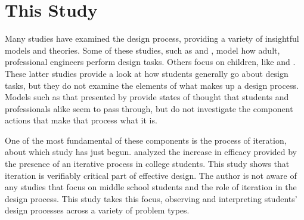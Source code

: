 \section{This Study}
Many studies have examined the design process, providing a variety of insightful models and theories. Some of these studies, such as \citet{schon83} and \citet{eckert09}, model how adult, professional engineers perform design tasks. Others focus on children, like \citet{welch} and \citet{lesh03}. These latter studies provide a look at how students generally go about design tasks, but they do not examine the elements of what makes up a design process. Models such as that presented by \citet{mos-design} provide states of thought that students and professionals alike seem to pass through, but do not investigate the component actions that make that process what it is. 

One of the most fundamental of these components is the process of iteration, about which study has just begun. \citet{dow09} analyzed the increase in efficacy provided by the presence of an iterative process in college students. This study shows that iteration is verifiably critical part of effective design.  %
The author is not aware of any studies that focus on middle school students and the role of iteration in the design process. This study takes this focus, observing and interpreting students' design processes across a variety of problem types.


